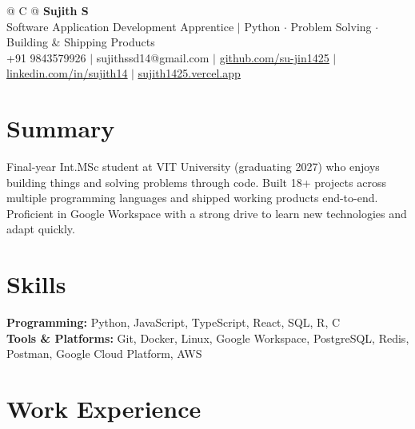 \documentclass[a4paper,10pt]{article}
\newcommand{\ulink}[2]{\href{#1}{\uline{#2}}}
\begin{document}
\pagestyle{empty}

\begin{tabularx}{\linewidth}{@{} C @{}}
{\color[HTML]{000000}\fontsize{30}{35}\selectfont\bfseries Sujith S} \\[5pt]
{\fontsize{10.5}{12.5}\selectfont\color[HTML]{3A3A3A}
Software Application Development Apprentice $|$ Python $\cdot$ Problem Solving $\cdot$ Building \& Shipping Products} \\[6pt]
{\fontsize{9.5}{11.5}\selectfont\textcolor[HTML]{3A3A3A}{+91 9843579926 $|$ sujithssd14@gmail.com $|$ \ulink{https://github.com/su-jin1425}{github.com/su-jin1425} $|$ \ulink{https://linkedin.com/in/sujith14}{linkedin.com/in/sujith14} $|$ \ulink{https://sujith1425.vercel.app}{sujith1425.vercel.app}}}
\end{tabularx}

\vspace{2pt}

\section{Summary}
\vspace{3pt}
{\color[HTML]{0A0A0A}\fontsize{11}{14}\selectfont
Final-year Int.MSc student at VIT University (graduating 2027) who enjoys building things and solving problems through code. Built 18+ projects across multiple programming languages and shipped working products end-to-end. Proficient in Google Workspace with a strong drive to learn new technologies and adapt quickly.}

\vspace{2pt}

\section{Skills}
\vspace{3pt}
{\color[HTML]{0A0A0A}\fontsize{11}{14}\selectfont
\textbf{Programming:} Python, JavaScript, TypeScript, React, SQL, R, C \\[2pt]
\textbf{Tools \& Platforms:} Git, Docker, Linux, Google Workspace, PostgreSQL, Redis, Postman, Google Cloud Platform, AWS}

\vspace{2pt}

\section{Work Experience}
\vspace{2pt}
\end{document}
